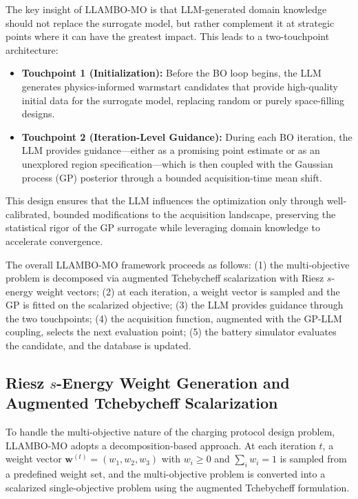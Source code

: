 \documentclass[lettersize,journal]{IEEEtran}
\begin{document}
The key insight of LLAMBO-MO is that LLM-generated domain knowledge should not replace the surrogate model, but rather complement it at strategic points where it can have the greatest impact. This leads to a two-touchpoint architecture:
\begin{itemize}
\item \textbf{Touchpoint 1 (Initialization):} Before the BO loop begins, the LLM generates physics-informed warmstart candidates that provide high-quality initial data for the surrogate model, replacing random or purely space-filling designs.
\item \textbf{Touchpoint 2 (Iteration-Level Guidance):} During each BO iteration, the LLM provides guidance---either as a promising point estimate or as an unexplored region specification---which is then coupled with the Gaussian process (GP) posterior through a bounded acquisition-time mean shift.
\end{itemize}

This design ensures that the LLM influences the optimization only through well-calibrated, bounded modifications to the acquisition landscape, preserving the statistical rigor of the GP surrogate while leveraging domain knowledge to accelerate convergence.

The overall LLAMBO-MO framework proceeds as follows: (1) the multi-objective problem is decomposed via augmented Tchebycheff scalarization with Riesz $s$-energy weight vectors; (2) at each iteration, a weight vector is sampled and the GP is fitted on the scalarized objective; (3) the LLM provides guidance through the two touchpoints; (4) the acquisition function, augmented with the GP-LLM coupling, selects the next evaluation point; (5) the battery simulator evaluates the candidate, and the database is updated.

\subsection{Riesz $s$-Energy Weight Generation and Augmented Tchebycheff Scalarization}

To handle the multi-objective nature of the charging protocol design problem, LLAMBO-MO adopts a decomposition-based approach. At each iteration $t$, a weight vector $\boldsymbol{w}^{(t)} = (w_1, w_2, w_3)$ with $w_i \geq 0$ and $\sum_i w_i = 1$ is sampled from a predefined weight set, and the multi-objective problem is converted into a scalarized single-objective problem using the augmented Tchebycheff formulation.
\end{document}
